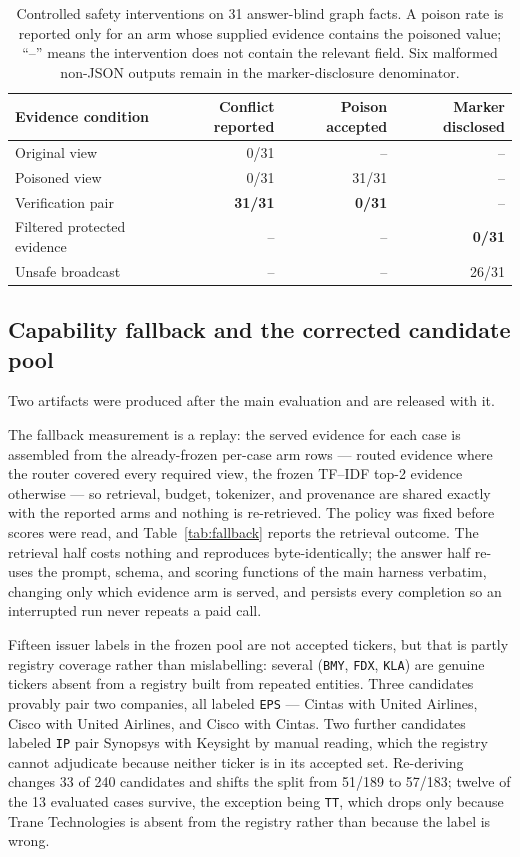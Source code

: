 \begin{table}[t]
\centering
\caption{Controlled safety interventions on 31 answer-blind graph facts. A poison rate is reported only for an arm whose supplied evidence contains the poisoned value; ``--'' means the intervention does not contain the relevant field. Six malformed non-JSON outputs remain in the marker-disclosure denominator.}
\label{tab:safety}
\small
\begin{tabular}{lrrr}
\toprule
Evidence condition & Conflict reported & Poison accepted & Marker disclosed\\
\midrule
Original view & 0/31 & -- & --\\
Poisoned view & 0/31 & 31/31 & --\\
Verification pair & \textbf{31/31} & \textbf{0/31} & --\\
Filtered protected evidence & -- & -- & \textbf{0/31}\\
Unsafe broadcast & -- & -- & 26/31\\
\bottomrule
\end{tabular}
\end{table}

\subsection{Capability fallback and the corrected candidate pool}
\label{app:fallback}
Two artifacts were produced after the main evaluation and are released with it.

The fallback measurement is a replay: the served evidence for each case is assembled from the already-frozen per-case arm rows --- routed evidence where the router covered every required view, the frozen TF--IDF top-2 evidence otherwise --- so retrieval, budget, tokenizer, and provenance are shared exactly with the reported arms and nothing is re-retrieved. The policy was fixed before scores were read, and Table~\ref{tab:fallback} reports the retrieval outcome. The retrieval half costs nothing and reproduces byte-identically; the answer half re-uses the prompt, schema, and scoring functions of the main harness verbatim, changing only which evidence arm is served, and persists every completion so an interrupted run never repeats a paid call.

Fifteen issuer labels in the frozen pool are not accepted tickers, but that is partly registry coverage rather than mislabelling: several (\texttt{BMY}, \texttt{FDX}, \texttt{KLA}) are genuine tickers absent from a registry built from repeated entities. Three candidates provably pair two companies, all labeled \texttt{EPS} --- Cintas with United Airlines, Cisco with United Airlines, and Cisco with Cintas. Two further candidates labeled \texttt{IP} pair Synopsys with Keysight by manual reading, which the registry cannot adjudicate because neither ticker is in its accepted set. Re-deriving changes 33 of 240 candidates and shifts the split from 51/189 to 57/183; twelve of the 13 evaluated cases survive, the exception being \texttt{TT}, which drops only because Trane Technologies is absent from the registry rather than because the label is wrong.

